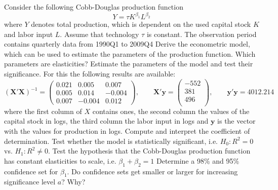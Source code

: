 \documentclass{article}
\begin{document}
\begin{Exercise}[title=(Cobb-Douglas Production Function)]
Consider the following Cobb-Douglas production function
$$Y = \tau K^{\beta_1} L^{\beta_2}$$
where $Y$ denotes total production, which is dependent on the used capital stock $K$ and labor input $L$. Assume that technology $\tau$ is constant. The observation period contains quarterly data from 1990Q1 to 2009Q4
\Question Derive the econometric model, which can be used to estimate the parameters of the production function.
\Question Which parameters are elasticities?
\Question Estimate the parameters of the model and test their significance. For this the following results are available:
	$$(\mathbf{X}'\mathbf{X})^{-1}=
	\begin{pmatrix}
    0.021 &   0.005 &   0.007\\
	0.005 &   0.014 &  -0.004\\
	0.007 &  -0.004 &   0.012	
	\end{pmatrix}, \qquad 
	\mathbf{X}'\mathbf{y}=\begin{pmatrix}
	-552\\
	381\\
	496\\
	\end{pmatrix}, \qquad
	\mathbf{y}'\mathbf{y}=4012.214
	$$
	where the first column of $X$ contains ones, the second column the values of the capital stock in logs, the third column the labor input in logs and $\mathbf{y}$ is the vector with the values for production in logs.
\Question Compute and interpret the coefficient of determination.
\Question Test whether the model is statistically significant, i.e. $H_0: R^2=0$ vs. $H_1: R^2 \neq 0$.
\Question Test the hypothesis that the Cobb-Douglas production function has constant elasticities to scale, i.e. $\beta_1+\beta_2=1$
\Question Determine a 98\% and 95\% confidence set for $\beta_1$. Do confidence sets get smaller or larger for increasing significance level $a$? Why?
\end{Exercise}
\end{document}
